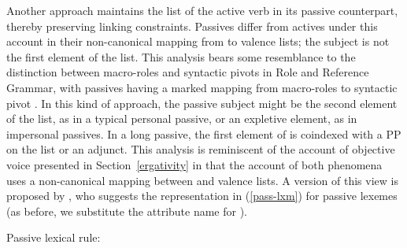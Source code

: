 \documentclass[output=paper
 	        ,biblatex
                ,babelshorthands
                ,newtxmath
                ,draftmode
                ,colorlinks, citecolor=brown
]{langscibook}
\begin{document}
Another approach maintains the \argst list of the active verb in its passive counterpart, thereby preserving linking constraints.
Passives differ from actives under this account in their non-canonical mapping from \argst to valence lists; the subject is not the first element of the \argst list. This analysis bears some resemblance to the distinction between macro-roles and syntactic pivots in Role and Reference Grammar, with passives having a marked mapping from macro-roles to syntactic pivot \citep{VanValinandLapolla1997}.  
In this kind of approach, the passive subject might be the second element of the \argst list, as in a typical personal passive, or an expletive element, as in impersonal passives.
In a long passive, the first element of \argst is coindexed with a PP on the  list or an adjunct.
This analysis is reminiscent of the account of  objective voice presented in Section~\ref{ergativity} in that the account of both phenomena uses a non-canonical mapping between \argst and valence lists.
A version of this view is proposed by \citet[246]{Davis2001}, who suggests the representation in (\ref{pass-lxm}) for passive lexemes (as before, we substitute the attribute name  for ).

\ea
\label{pass-lxm}
Passive lexical rule:\\
\z
\end{document}
